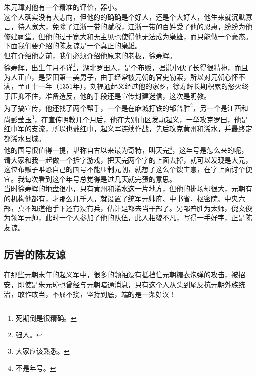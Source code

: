 \begin{multicols}{\theparacolNo}
朱元璋对他有一个精准的评价，器小。\\

这个人确实没有大志向，但他的的确确是个好人，还是个大好人，他生来就沉默寡言，待人宽大，免除了江浙一带的赋税，江浙一带的百姓受了他的恩惠，纷纷为他修建祠堂。但他的过于宽大和无主见也使得他无法成为枭雄，而只能做一个豪杰。\\

下面我们要介绍的陈友谅是一个真正的枭雄。\\

但在介绍他之前，我们必须介绍他原来的老板，徐寿辉。\\

徐寿辉，出生年月不详\footnote{死期倒是很精确。}，湖北罗田人，是个布贩，据说小伙子长得很精神，而且为人正直，是罗田第一美男子，由于经常被元朝的官吏勒索，所以对元朝心怀不满，至正十一年（1351年），刘福通起义经过他的家乡，徐寿辉长期积累的怒火终于压抑不住，准备造反，他的手段还是宣传封建迷信，这次是明教。\\

为了搞宣传，他还找了两个帮手，一个是在麻城打铁的邹普胜\footnote{强人。}，另一个是江西和尚彭莹玉\footnote{大家应该熟悉。}，在宣传明教几个月后，他在大别山区发动起义，一举攻克罗田，他是红巾军的支流，所以也戴红巾，起义军连续作战，先后攻克黄州和浠水，并最终定都浠水县城。\\

他的国号很值得一提，堪称自古以来最为奇特，叫天完\footnote{不是年号。}，这年号是怎么来的呢，请大家和我一起做一个拆字游戏，把天完两个字的上面去掉，就可以发现是大元，这位布贩子唯恐自己的国号不能压制元朝，就想了这么个馊主意，在字上面讨个便宜。我每次看到这个年号总觉得是过几天就完蛋的意思。\\

当时徐寿辉的地盘很小，只有黄州和浠水这一片地方，但他的排场却很大，元朝有的机构他都有，才那么几千人，就设置了统军元帅府、中书省、枢密院、中央六部，真不知道他手下还有没有兵，估计是都去当干部了。另邹普胜为太师，倪文俊为领军元帅，此时一个人参加了他的队伍，此人相貌不凡，写得一手好字，正是陈友谅。\\

\subsection{厉害的陈友谅}
在那些元朝末年的起义军中，很多的领袖没有抵挡住元朝糖衣炮弹的攻击，被招安，即使是朱元璋也曾经与元朝暗通消息，只有这个人从头到尾反抗元朝外族统治，敢作敢当，不屈不挠，坚持到底，端的是一条好汉！\\


\end{multicols}
